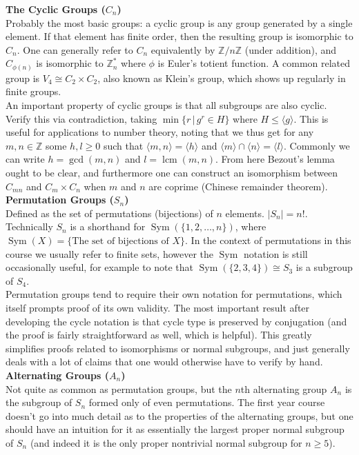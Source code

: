 \documentclass{tikzposter} %
\DeclareMathOperator{\lcm}{lcm}
\DeclareMathOperator{\Sym}{Sym}
\begin{document}
\begin{columns}
{  \textbf{The Cyclic Groups ($C_{n}$)} \\
  Probably the most basic groups: a cyclic group is any group generated by a single element. If that element has finite order, then the resulting group is isomorphic to $C_{n}$. One can generally refer to $C_{n}$ equivalently by $\mathbb{Z} / n\mathbb{Z}$ (under addition), and $C_{\phi(n)}$ is isomorphic to $\mathbb{Z}^{\ast}_{n}$ where $\phi$ is Euler's totient function. A common related group is $V_{4} \cong C_{2} \times C_{2}$, also known as Klein's group, which shows up regularly in finite groups. \\

  An important property of cyclic groups is that all subgroups are also cyclic. Verify this via contradiction, taking $\min\{r \,|\, g^{r} \in H\}$ where $H \le \langle g \rangle $. This is useful for applications to number theory, noting that we thus get for any $m, n \in \mathbb{Z}$ some $h, l \ge 0$ such that $\langle m, n \rangle = \langle h \rangle$ and $\langle m \rangle \cap \langle n \rangle = \langle l \rangle$. Commonly we can write $h = \gcd(m,n)$ and $l = \lcm(m,n)$. From here Bezout's lemma ought to be clear, and furthermore one can construct an isomorphism between $C_{mn}$ and $C_{m} \times C_{n}$ when $m$ and $n$ are coprime (Chinese remainder theorem). \\

  \textbf{Permutation Groups ($S_{n}$)} \\
  Defined as the set of permutations (bijections) of $n$ elements. $|S_{n}| = n!$. Technically $S_{n}$ is a shorthand for $\Sym(\{1, 2, \dots, n\})$, where $\Sym(X) = \{\text{The set of bijections of $X$}\}$. In the context of permutations in this course we usually refer to finite sets, however the $\Sym$ notation is still occasionally useful, for example to note that $\Sym(\{2, 3, 4\}) \cong S_{3}$ is a subgroup of $S_{4}$. \\

  Permutation groups tend to require their own notation for permutations, which itself prompts proof of its own validity. The most important result after developing the cycle notation is that cycle type is preserved by conjugation (and the proof is fairly straightforward as well, which is helpful). This greatly simplifies proofs related to isomorphisms or normal subgroups, and just generally deals with a lot of claims that one would otherwise have to verify by hand. \\

  \textbf{Alternating Groups ($A_{n}$)} \\
  Not quite as common as permutation groups, but the $n$th alternating group $A_{n}$ is the subgroup of $S_{n}$ formed only of even permutations. The first year course doesn't go into much detail as to the properties of the alternating groups, but one should have an intuition for it as essentially the largest proper normal subgroup of $S_{n}$ (and indeed it is the only proper nontrivial normal subgroup for $n \ge 5$). \\

}
\end{columns}
\end{document}
